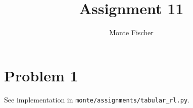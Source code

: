 \documentclass{article}
\title{Assignment 11}
\author{Monte Fischer}
\begin{document}
\maketitle

\section*{Problem 1}

See implementation in \texttt{monte/assignments/tabular\_rl.py}.
\end{document}
